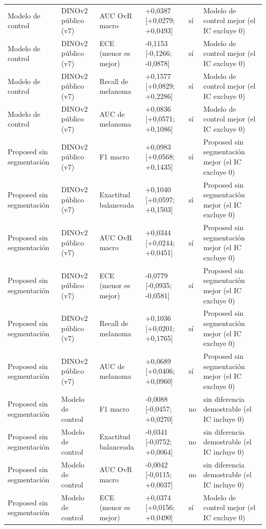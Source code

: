 \begin{longtable}{@{}llllll@{}}
Modelo de control & DINOv2 público (v7) & AUC OvR macro & +0,0387 [+0,0279; +0,0493] & sí & Modelo de control mejor (el IC excluye 0) \\
Modelo de control & DINOv2 público (v7) & ECE (menor es mejor) & -0,1153 [-0,1266; -0,0878] & sí & Modelo de control mejor (el IC excluye 0) \\
Modelo de control & DINOv2 público (v7) & Recall de melanoma & +0,1577 [+0,0829; +0,2286] & sí & Modelo de control mejor (el IC excluye 0) \\
Modelo de control & DINOv2 público (v7) & AUC de melanoma & +0,0836 [+0,0571; +0,1086] & sí & Modelo de control mejor (el IC excluye 0) \\
Proposed sin segmentación & DINOv2 público (v7) & F1 macro & +0,0983 [+0,0568; +0,1435] & sí & Proposed sin segmentación mejor (el IC excluye 0) \\
Proposed sin segmentación & DINOv2 público (v7) & Exactitud balanceada & +0,1040 [+0,0597; +0,1503] & sí & Proposed sin segmentación mejor (el IC excluye 0) \\
Proposed sin segmentación & DINOv2 público (v7) & AUC OvR macro & +0,0344 [+0,0244; +0,0451] & sí & Proposed sin segmentación mejor (el IC excluye 0) \\
Proposed sin segmentación & DINOv2 público (v7) & ECE (menor es mejor) & -0,0779 [-0,0935; -0,0581] & sí & Proposed sin segmentación mejor (el IC excluye 0) \\
Proposed sin segmentación & DINOv2 público (v7) & Recall de melanoma & +0,1036 [+0,0201; +0,1765] & sí & Proposed sin segmentación mejor (el IC excluye 0) \\
Proposed sin segmentación & DINOv2 público (v7) & AUC de melanoma & +0,0689 [+0,0406; +0,0960] & sí & Proposed sin segmentación mejor (el IC excluye 0) \\
Proposed sin segmentación & Modelo de control & F1 macro & -0,0088 [-0,0457; +0,0270] & no & sin diferencia demostrable (el IC incluye 0) \\
Proposed sin segmentación & Modelo de control & Exactitud balanceada & -0,0341 [-0,0752; +0,0064] & no & sin diferencia demostrable (el IC incluye 0) \\
Proposed sin segmentación & Modelo de control & AUC OvR macro & -0,0042 [-0,0115; +0,0037] & no & sin diferencia demostrable (el IC incluye 0) \\
Proposed sin segmentación & Modelo de control & ECE (menor es mejor) & +0,0374 [+0,0156; +0,0490] & sí & Modelo de control mejor (el IC excluye 0) \\

\end{longtable}
